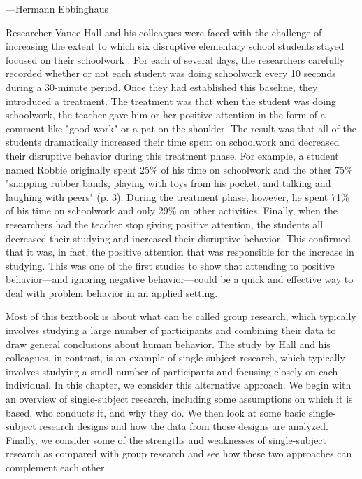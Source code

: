  {---Hermann Ebbinghaus}

Researcher Vance Hall and his colleagues were faced with the challenge of increasing the extent to which six disruptive elementary school students stayed focused on their schoolwork \citep{hall_effects_1968}. For each of several days, the researchers carefully recorded whether or not each student was doing schoolwork every 10 seconds during a 30-minute period. Once they had established this baseline, they introduced a treatment. The treatment was that when the student was doing schoolwork, the teacher gave him or her positive attention in the form of a comment like "good work" or a pat on the shoulder. The result was that all of the students dramatically increased their time spent on schoolwork and decreased their disruptive behavior during this treatment phase. For example, a student named Robbie originally spent 25\% of his time on schoolwork and the other 75\% "snapping rubber bands, playing with toys from his pocket, and talking and laughing with peers" (p. 3). During the treatment phase, however, he spent 71\% of his time on schoolwork and only 29\% on other activities. Finally, when the researchers had the teacher stop giving positive attention, the students all decreased their studying and increased their disruptive behavior. This confirmed that it was, in fact, the positive attention that was responsible for the increase in studying. This was one of the first studies to show that attending to positive behavior---and ignoring negative behavior---could be a quick and effective way to deal with problem behavior in an applied setting.

Most of this textbook is about what can be called group research, which typically involves studying a large number of participants and combining their data to draw general conclusions about human behavior. The study by Hall and his colleagues, in contrast, is an example of single-subject research, which typically involves studying a small number of participants and focusing closely on each individual. In this chapter, we consider this alternative approach. We begin with an overview of single-subject research, including some assumptions on which it is based, who conducts it, and why they do. We then look at some basic single-subject research designs and how the data from those designs are analyzed. Finally, we consider some of the strengths and weaknesses of single-subject research as compared with group research and see how these two approaches can complement each other.

